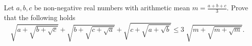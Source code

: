 Let $a,b,c$ be non-negative real numbers with arithmetic mean $m=\frac{a+b+c}{3}$.
Prove that the following holds
$$\sqrt{a+\sqrt{b+\sqrt{c}}}+\sqrt{b+\sqrt{c+\sqrt{a}}}+
\sqrt{c+\sqrt{a+\sqrt{b}}}\leq 3\;\sqrt{m+\sqrt{m+\sqrt{m}}}.$$

